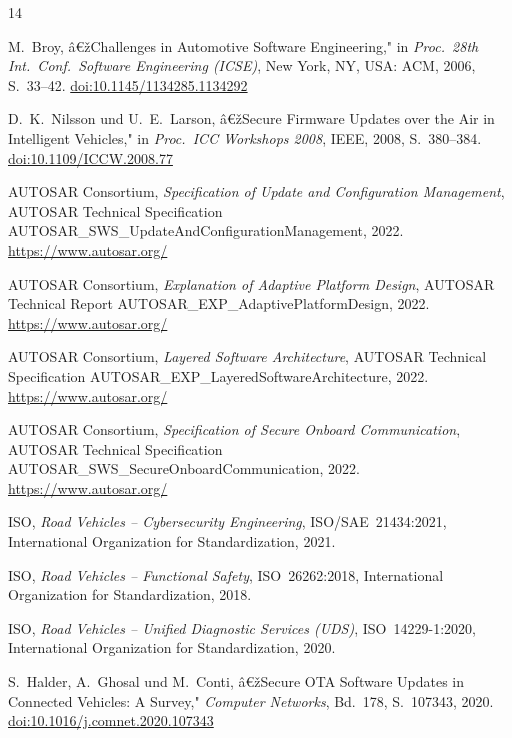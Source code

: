 ﻿\documentclass[12pt,a4paper,twoside]{article}
\begin{document}

\begin{thebibliography}{14}

M.~Broy, â€žChallenges in Automotive Software Engineering," in
\textit{Proc.\ 28th Int.\ Conf.\ Software Engineering (ICSE)},
New York, NY, USA: ACM, 2006, S.~33--42.
\href{https://doi.org/10.1145/1134285.1134292}{doi:10.1145/1134285.1134292}

D.~K.~Nilsson und U.~E.~Larson, â€žSecure Firmware Updates over the Air in
Intelligent Vehicles," in \textit{Proc.\ ICC Workshops 2008},
IEEE, 2008, S.~380--384.
\href{https://doi.org/10.1109/ICCW.2008.77}{doi:10.1109/ICCW.2008.77}

AUTOSAR Consortium, \textit{Specification of Update and Configuration
Management}, AUTOSAR Technical Specification
AUTOSAR\_SWS\_UpdateAndConfigurationManagement, 2022.
\url{https://www.autosar.org/}

AUTOSAR Consortium, \textit{Explanation of Adaptive Platform Design},
AUTOSAR Technical Report AUTOSAR\_EXP\_AdaptivePlatformDesign, 2022.
\url{https://www.autosar.org/}

AUTOSAR Consortium, \textit{Layered Software Architecture},
AUTOSAR Technical Specification
AUTOSAR\_EXP\_LayeredSoftwareArchitecture, 2022.
\url{https://www.autosar.org/}

AUTOSAR Consortium, \textit{Specification of Secure Onboard Communication},
AUTOSAR Technical Specification
AUTOSAR\_SWS\_SecureOnboardCommunication, 2022.
\url{https://www.autosar.org/}

ISO, \textit{Road Vehicles -- Cybersecurity Engineering},
ISO/SAE~21434:2021, International Organization for Standardization, 2021.

ISO, \textit{Road Vehicles -- Functional Safety},
ISO~26262:2018, International Organization for Standardization, 2018.

ISO, \textit{Road Vehicles -- Unified Diagnostic Services (UDS)},
ISO~14229-1:2020, International Organization for Standardization, 2020.

S.~Halder, A.~Ghosal und M.~Conti, â€žSecure OTA Software Updates in
Connected Vehicles: A Survey," \textit{Computer Networks},
Bd.~178, S.~107343, 2020.
\href{https://doi.org/10.1016/j.comnet.2020.107343}{doi:10.1016/j.comnet.2020.107343}


\end{thebibliography}
\end{document}
